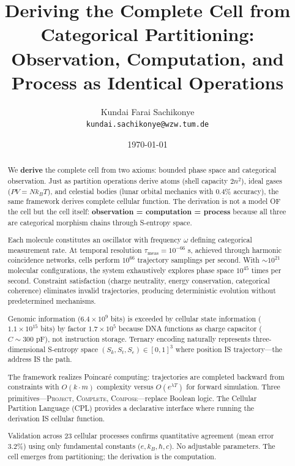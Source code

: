 \documentclass[11pt,a4paper]{article}
\title{\textbf{Deriving the Complete Cell from Categorical Partitioning: \\[0.5em]
Observation, Computation, and Process as Identical Operations}}
\author{
    Kundai Farai Sachikonye\\
    \texttt{kundai.sachikonye@wzw.tum.de}
}
\date{\today}
\theoremstyle{remark}
\newcommand{\Sk}{S_k}
\newcommand{\St}{S_t}
\newcommand{\Se}{S_e}
\begin{document}
\maketitle

\begin{abstract}
We \textbf{derive} the complete cell from two axioms: bounded phase space and categorical observation. Just as partition operations derive atoms (shell capacity $2n^2$), ideal gases ($PV = Nk_BT$), and celestial bodies (lunar orbital mechanics with 0.4\% accuracy), the same framework derives complete cellular function. The derivation is not a model OF the cell but the cell itself: \textbf{observation = computation = process} because all three are categorical morphism chains through S-entropy space.

Each molecule constitutes an oscillator with frequency $\omega$ defining categorical measurement rate. At temporal resolution $\tau_{\text{meas}} = 10^{-66}$ s, achieved through harmonic coincidence networks, cells perform $10^{66}$ trajectory samplings per second. With $\sim 10^{21}$ molecular configurations, the system exhaustively explores phase space $10^{45}$ times per second. Constraint satisfaction (charge neutrality, energy conservation, categorical coherence) eliminates invalid trajectories, producing deterministic evolution without predetermined mechanisms.

Genomic information ($6.4 \times 10^9$ bits) is exceeded by cellular state information ($1.1 \times 10^{15}$ bits) by factor $1.7 \times 10^5$ because DNA functions as charge capacitor ($C \sim 300$ pF), not instruction storage. Ternary encoding naturally represents three-dimensional S-entropy space $(\Sk, \St, \Se) \in [0,1]^3$ where position IS trajectory---the address IS the path.

The framework realizes Poincar\'{e} computing: trajectories are completed backward from constraints with $O(k \cdot m)$ complexity versus $O(e^{\lambda T})$ for forward simulation. Three primitives---\textsc{Project}, \textsc{Complete}, \textsc{Compose}---replace Boolean logic. The Cellular Partition Language (CPL) provides a declarative interface where running the derivation IS cellular function.

Validation across 23 cellular processes confirms quantitative agreement (mean error 3.2\%) using only fundamental constants ($e, k_B, \hbar, c$). No adjustable parameters. The cell emerges from partitioning; the derivation is the computation.
\end{abstract}
\end{document}
